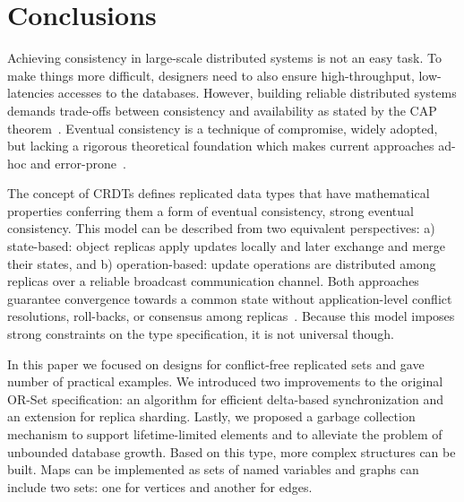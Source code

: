 \section{Conclusions}
\label{sec:conclusions}

Achieving consistency in large-scale distributed systems is not an easy task. To
make things more difficult, designers need to also ensure high-throughput,
low-latencies accesses to the databases. However, building reliable distributed
systems demands trade-offs between consistency and availability as stated by the
CAP theorem~\cite{Gilbert:2002:BCF:564585.564601}. Eventual consistency is a
technique of compromise, widely adopted, but lacking a rigorous theoretical
foundation which makes current approaches ad-hoc and
error-prone~\cite{DeCandia:2007:DAH:1294261.1294281}.

The concept of CRDTs defines replicated data types that have mathematical
properties conferring them a form of eventual consistency, strong eventual
consistency. This model can be described from two equivalent perspectives:
a) state-based: object replicas apply updates locally and later exchange and
merge their states, and b) operation-based: update operations are distributed
among replicas over a reliable broadcast communication channel. Both approaches
guarantee convergence towards a common state without application-level conflict
resolutions, roll-backs, or consensus among
replicas~\cite{Terry:1995:MUC:224056.224070}. Because this model imposes strong
constraints on the type specification, it is not universal though.

In this paper we focused on designs for conflict-free replicated sets and gave
number of practical examples. We introduced two improvements to the original
OR-Set specification: an algorithm for efficient delta-based synchronization and
an extension for replica sharding. Lastly, we proposed a garbage collection
mechanism to support lifetime-limited elements and to alleviate the problem of
unbounded database growth. Based on this type, more complex structures can be
built. Maps can be implemented as sets of named variables and graphs can include
two sets: one for vertices and another for edges.
